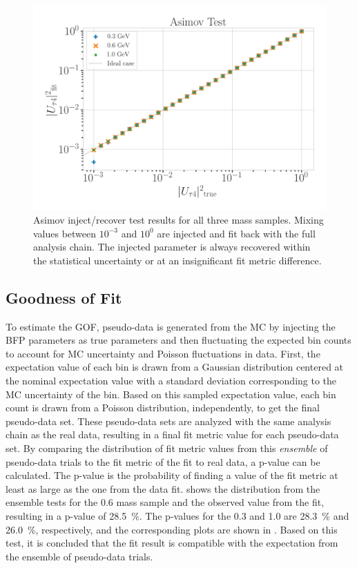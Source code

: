 \begin{figure}[h]
    \includegraphics{figures/results/checks/asimov_tests_combined.png}
	\caption[Asimov inject/recover test]{Asimov inject/recover test results for all three mass samples. Mixing values between $10^{-3}$ and $10^{0}$ are injected and fit back with the full analysis chain. The injected parameter is always recovered within the statistical uncertainty or at an insignificant fit metric difference.}
\end{figure}


\subsection{Goodness of Fit} 

To estimate the GOF, pseudo-data is generated from the MC by injecting the BFP parameters as true parameters and then fluctuating the expected bin counts to account for MC uncertainty and Poisson fluctuations in data. First, the expectation value of each bin is drawn from a Gaussian distribution centered at the nominal expectation value with a standard deviation corresponding to the MC uncertainty of the bin. Based on this sampled expectation value, each bin count is drawn from a Poisson distribution, independently, to get the final pseudo-data set. These pseudo-data sets are analyzed with the same analysis chain as the real data, resulting in a final fit metric value for each pseudo-data set. By comparing the distribution of fit metric values from this \textit{ensemble} of pseudo-data trials to the fit metric of the fit to real data, a p-value can be calculated. The p-value is the probability of finding a value of the fit metric at least as large as the one from the data fit.  shows the distribution from the ensemble tests for the \SI{0.6}{\gev} mass sample and the observed value from the fit, resulting in a p-value of \SI{28.5}{\percent}. The p-values for the \SI{0.3}{\gev} and \SI{1.0}{\gev} are \SI{28.3}{\percent} and \SI{26.0}{\percent}, respectively, and the corresponding plots are shown in . Based on this test, it is concluded that the fit result is compatible with the expectation from the ensemble of pseudo-data trials.

